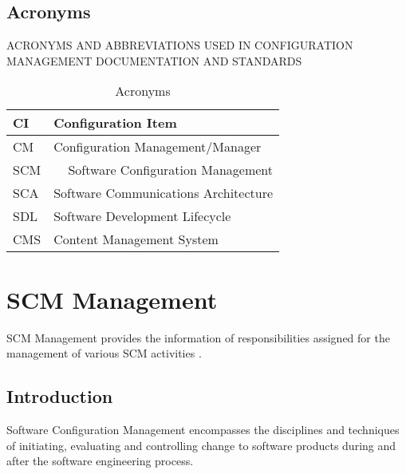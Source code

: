 \documentclass[]{article}
\begin{document}
\subsection{Acronyms}
ACRONYMS AND ABBREVIATIONS USED IN CONFIGURATION
MANAGEMENT DOCUMENTATION AND STANDARDS


\begin{table}[]
\centering
\caption{Acronyms}
\label{my-label}
\begin{tabular}{|l|l|}
\hline
CI  & Configuration Item                                     \\ \hline
CM  & Configuration Management/Manager                       \\ \hline
SCM & \multicolumn{1}{r|}{Software Configuration Management} \\ \hline
SCA & Software Communications Architecture                   \\ \hline
SDL & Software Development Lifecycle                         \\ \hline
CMS & Content Management System                              \\ \hline
\end{tabular}
\end{table}

\section{SCM Management}
SCM Management provides the information of responsibilities assigned for the management of various SCM activities .

\subsection{Introduction}
Software Configuration Management encompasses the disciplines and
techniques of initiating, evaluating and controlling change to software
products during and after the software engineering process.\\
\end{document}

